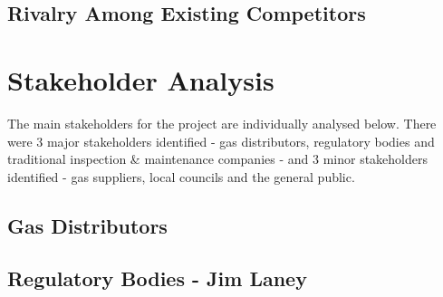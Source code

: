\documentclass[11pt]{article}		%
\begin{document}
		\subsection[Rivalry Among Existing Competitors]{Rivalry Among Existing Competitors}
		
	\section{Stakeholder Analysis}
	
		The main stakeholders for the project are individually analysed below.
		There were 3 major stakeholders identified - gas distributors, regulatory bodies and traditional inspection \& maintenance companies - and 3 minor stakeholders identified - gas suppliers, local councils and the general public.
		
		\subsection[Gas Distributors]{Gas Distributors}
		
		\subsection[Regulatory Bodies]{Regulatory Bodies - Jim Laney}
			
\end{document}
